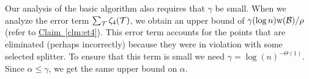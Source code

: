 \documentclass{acmsmall}
\newcommand{\cA}{{\cal A}}
\newcommand{\cB}{{\cal B}}
\newcommand{\cT}{{\cal T}}
\newcommand{\Clm}[1]{\hyperref[clm:#1]{Claim~\ref*{clm:#1}}} %
\newcommand{\terminalbox}{{\rm{\bf TerminalBox}}}
\newcommand{\width}{{\bf {\rm  w}}}
\newcommand{\gridprec}{\alpha}
\newcommand{\errorterm}{\zeta}
\newcommand{\findsplitter}{{\rm {\bf FindSplitter}}}
\begin{document}
Our  analysis of the basic algorithm also requires that $\gamma$ be small.
When we analyze the
error term $\sum_{\cT} \errorterm_4(\cT)$, we obtain an upper bound of  $\gamma (\log n) \width(\cB)/\rho$ (refer to \Clm{et4}). 
This error term accounts for the points that are eliminated (perhaps incorrectly)
because they were in violation with some selected splitter.
To ensure that this term is small we need  $\gamma=\log(n)^{-\Theta(1)}$.  Since $\gridprec \leq \gamma$,
we get the same upper bound on $\gridprec$.  

%
%	
%
%
%
\end{document}
